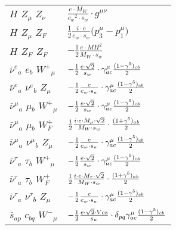 \begin{center}
\begin{tabular}{|l|l|}
${H}_{}$ \phantom{-} ${Z}_{\mu }$ \phantom{-} ${Z}_{\nu }$ \phantom{-}  &
	$\frac{ e \cdot M_W}{ c_w{}^2  \cdot s_w}\cdot g^{\mu \nu} $\\[2mm]
${H}_{}$ \phantom{-} ${Z}_{\mu }$ \phantom{-} $Z_F{}_{}$ \phantom{-}  &
	$\frac{1}{2}\frac{ i \cdot e}{ c_w \cdot s_w}\big(p_3^\mu -p_1^\mu \big)$\\[2mm]
${H}_{}$ \phantom{-} $Z_F{}_{}$ \phantom{-} $Z_F{}_{}$ \phantom{-}  &
	$-\frac{1}{2}\frac{ e \cdot MH{}^2 }{ M_W \cdot s_w}$\\[2mm]
$\bar{\nu}^e{}_{a }$ \phantom{-} $e{}_{b }$ \phantom{-} $W^+{}_{\mu }$ \phantom{-}  &
	$-\frac{1}{2}\frac{ e \cdot\sqrt{2}}{ s_w}\cdot \gamma_{a c}^\mu {(1-\gamma^5)_{c b}\over 2} $\\[2mm]
$\bar{\nu}^e{}_{a }$ \phantom{-} $\nu^e{}_{b }$ \phantom{-} ${Z}_{\mu }$ \phantom{-}  &
	$-\frac{1}{2}\frac{ e}{ c_w \cdot s_w}\cdot \gamma_{a c}^\mu {(1-\gamma^5)_{c b}\over 2} $\\[2mm]
$\bar{\nu}^\mu{}_{a }$ \phantom{-} $\mu{}_{b }$ \phantom{-} $W^+{}_{\mu }$ \phantom{-}  &
	$-\frac{1}{2}\frac{ e \cdot\sqrt{2}}{ s_w}\cdot \gamma_{a c}^\mu {(1-\gamma^5)_{c b}\over 2} $\\[2mm]
$\bar{\nu}^\mu{}_{a }$ \phantom{-} $\mu{}_{b }$ \phantom{-} $W^+_F{}_{}$ \phantom{-}  &
	$\frac{1}{2}\frac{ i \cdot e \cdot M_\mu \cdot\sqrt{2}}{ M_W \cdot s_w}\cdot {(1+\gamma^5)_{a b}\over 2} $\\[2mm]
$\bar{\nu}^\mu{}_{a }$ \phantom{-} $\nu^\mu{}_{b }$ \phantom{-} ${Z}_{\mu }$ \phantom{-}  &
	$-\frac{1}{2}\frac{ e}{ c_w \cdot s_w}\cdot \gamma_{a c}^\mu {(1-\gamma^5)_{c b}\over 2} $\\[2mm]
$\bar{\nu}^\tau{}_{a }$ \phantom{-} $\tau{}_{b }$ \phantom{-} $W^+{}_{\mu }$ \phantom{-}  &
	$-\frac{1}{2}\frac{ e \cdot\sqrt{2}}{ s_w}\cdot \gamma_{a c}^\mu {(1-\gamma^5)_{c b}\over 2} $\\[2mm]
$\bar{\nu}^\tau{}_{a }$ \phantom{-} $\tau{}_{b }$ \phantom{-} $W^+_F{}_{}$ \phantom{-}  &
	$\frac{1}{2}\frac{ i \cdot e \cdot M_\tau \cdot\sqrt{2}}{ M_W \cdot s_w}\cdot {(1+\gamma^5)_{a b}\over 2} $\\[2mm]
$\bar{\nu}^\tau{}_{a }$ \phantom{-} $\nu^\tau{}_{b }$ \phantom{-} ${Z}_{\mu }$ \phantom{-}  &
	$-\frac{1}{2}\frac{ e}{ c_w \cdot s_w}\cdot \gamma_{a c}^\mu {(1-\gamma^5)_{c b}\over 2} $\\[2mm]
$\bar{s}{}_{a p }$ \phantom{-} $c{}_{b q }$ \phantom{-} $W^-{}_{\mu }$ \phantom{-}  &
	$-\frac{1}{2}\frac{ e \cdot\sqrt{2} \cdot Vcs}{ s_w}\cdot \delta_{p q} \gamma_{a c}^\mu {(1-\gamma^5)_{c b}\over 2} $\\[2mm]

\end{tabular}
\end{center}
